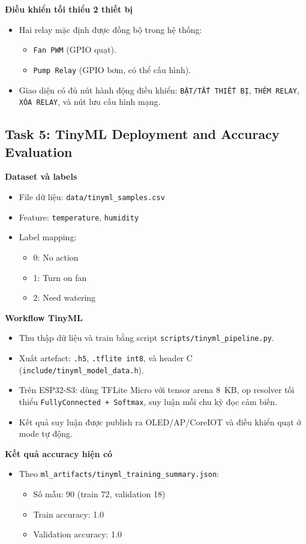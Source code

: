 \textbf{Điều khiển tối thiểu 2 thiết bị}
\begin{itemize}
    \item Hai relay mặc định được đồng bộ trong hệ thống:
    \begin{itemize}
        \item \texttt{Fan PWM} (GPIO quạt).
        \item \texttt{Pump Relay} (GPIO bơm, có thể cấu hình).
    \end{itemize}
    \item Giao diện có đủ nút hành động điều khiển: \texttt{BẬT/TẮT THIẾT BỊ}, \texttt{THÊM RELAY}, \texttt{XÓA RELAY}, và nút lưu cấu hình mạng.
\end{itemize}

\subsection{Task 5: TinyML Deployment and Accuracy Evaluation}
\textbf{Dataset và labels}
\begin{itemize}
    \item File dữ liệu: \texttt{data/tinyml\_samples.csv}
    \item Feature: \texttt{temperature}, \texttt{humidity}
    \item Label mapping:
    \begin{itemize}
        \item 0: No action
        \item 1: Turn on fan
        \item 2: Need watering
    \end{itemize}
\end{itemize}

\textbf{Workflow TinyML}
\begin{itemize}
    \item Thu thập dữ liệu và train bằng script \texttt{scripts/tinyml\_pipeline.py}.
    \item Xuất artefact: \texttt{.h5}, \texttt{.tflite int8}, và header C (\texttt{include/tinyml\_model\_data.h}).
    \item Trên ESP32-S3: dùng TFLite Micro với tensor arena \SI{8}{KB}, op resolver tối thiểu \texttt{FullyConnected + Softmax}, suy luận mỗi chu kỳ đọc cảm biến.
    \item Kết quả suy luận được publish ra OLED/AP/CoreIOT và điều khiển quạt ở mode tự động.
\end{itemize}

\textbf{Kết quả accuracy hiện có}
\begin{itemize}
    \item Theo \texttt{ml\_artifacts/tinyml\_training\_summary.json}:
    \begin{itemize}
        \item Số mẫu: 90 (train 72, validation 18)
        \item Train accuracy: 1.0
        \item Validation accuracy: 1.0
    \end{itemize}
\end{itemize}

